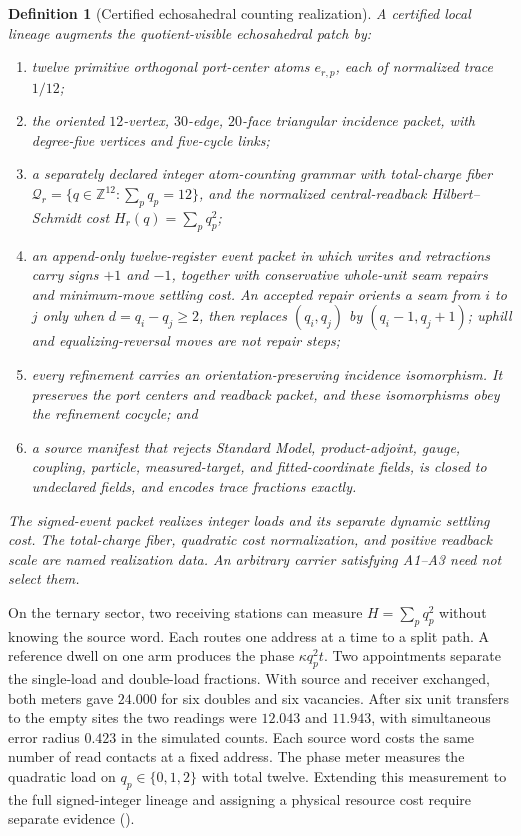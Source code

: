 \documentclass[11pt]{article}
\newtheorem{definition}[theorem]{Definition}
\theoremstyle{remark}
\theoremstyle{plain}
\begin{document}
\begin{definition}[Certified echosahedral counting realization]
\label{def:certified-echosahedral-lineage}
A certified local lineage augments the quotient-visible echosahedral patch by:
\begin{enumerate}[leftmargin=2em,label=\textup{(\roman*)}]
\item twelve primitive orthogonal port-center atoms \(e_{r,p}\), each of
normalized trace \(1/12\);
\item the oriented \(12\)-vertex, \(30\)-edge, \(20\)-face triangular
incidence packet, with degree-five vertices and five-cycle links;
\item a separately declared integer atom-counting grammar with total-charge
fiber \(\mathcal Q_r=\{q\in\mathbb Z^{12}:\sum_pq_p=12\}\), and the
normalized central-readback Hilbert--Schmidt cost
\(H_r(q)=\sum_pq_p^2\);
\item an append-only twelve-register event packet in which writes and
retractions carry signs \(+1\) and \(-1\), together with conservative
whole-unit seam repairs and minimum-move settling cost.  An accepted repair
orients a seam from \(i\) to \(j\) only when
\(d=q_i-q_j\ge2\), then replaces
\((q_i,q_j)\) by \((q_i-1,q_j+1)\); uphill and equalizing-reversal moves are
not repair steps;
\item every refinement carries an orientation-preserving incidence
isomorphism. It preserves the port centers and readback packet, and these
isomorphisms obey the refinement cocycle; and
\item a source manifest that rejects Standard Model, product-adjoint, gauge,
coupling, particle, measured-target, and fitted-coordinate fields, is closed
to undeclared fields, and encodes trace fractions exactly.
\end{enumerate}
The signed-event packet realizes integer loads and its separate dynamic
settling cost. The total-charge fiber, quadratic cost normalization, and
positive readback scale are named realization data. An arbitrary carrier
satisfying A1--A3 need not select them.
\end{definition}

On the ternary sector, two receiving stations can measure
$H=\sum_p q_p^2$ without knowing the source word. Each routes one
address at a time to a split path. A reference dwell on one arm
produces the phase $\kappa q_p^2 t$. Two appointments separate the
single-load and double-load fractions. With source and receiver
exchanged, both meters gave $24.000$ for six doubles and six vacancies.
After six unit transfers to the empty sites the two readings were
$12.043$ and $11.943$, with simultaneous error radius $0.423$ in
the simulated counts. Each source word costs the same number of
read contacts at a fixed address. The phase meter measures the
quadratic load on $q_p\in\{0,1,2\}$ with total twelve. Extending this
measurement to the full signed-integer lineage and assigning a physical
resource cost require separate evidence
().
\end{document}
